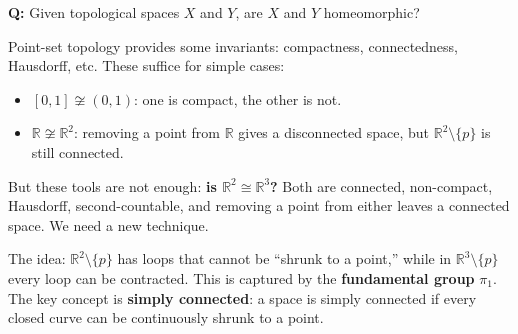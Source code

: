 \documentclass[11pt]{report}
\begin{document}
\begin{rembox}
\textbf{Q:} Given topological spaces $X$ and $Y$, are $X$ and $Y$ homeomorphic?

Point-set topology provides some invariants: compactness, connectedness, Hausdorff, etc. These suffice for simple cases:
\begin{itemize}[nosep]
    \item $[0,1] \not\cong (0,1)$: one is compact, the other is not.
    \item $\mathbb{R} \not\cong \mathbb{R}^2$: removing a point from $\mathbb{R}$ gives a disconnected space, but $\mathbb{R}^2 \setminus \{p\}$ is still connected.
\end{itemize}
But these tools are not enough: \textbf{is $\mathbb{R}^2 \cong \mathbb{R}^3$?} Both are connected, non-compact, Hausdorff, second-countable, and removing a point from either leaves a connected space. We need a new technique.

The idea: $\mathbb{R}^2 \setminus \{p\}$ has loops that cannot be ``shrunk to a point,'' while in $\mathbb{R}^3 \setminus \{p\}$ every loop can be contracted. This is captured by the \textbf{fundamental group} $\pi_1$. The key concept is \textbf{simply connected}: a space is simply connected if every closed curve can be continuously shrunk to a point.
\end{rembox}
\end{document}
